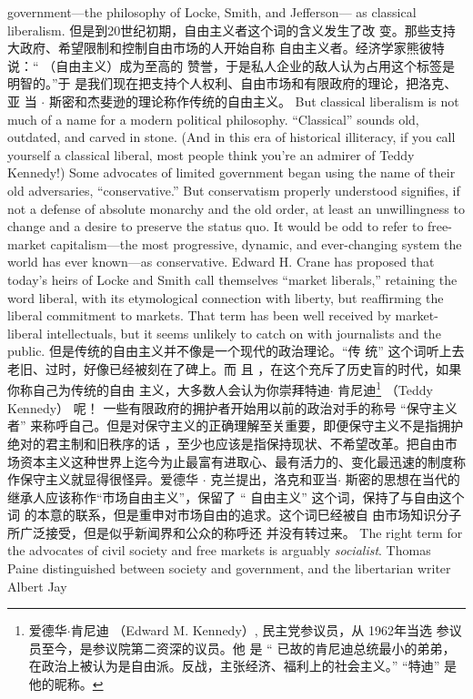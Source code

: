 \begin{paracol}{2}
government---the philosophy of Locke, Smith, and Jefferson---
as classical liberalism.
\switchcolumn
但是到20世纪初期，自由主义者这个词的含义发生了改
变。那些支持大政府、希望限制和控制自由市场的人开始自称
自由主义者。经济学家熊彼特说：“ （自由主义）成为至高的
赞誉，于是私人企业的敌人认为占用这个标签是明智的。”于
是我们现在把支持个人权利、自由市场和有限政府的理论，把洛克、亚 当 $\cdot$ 斯密和杰斐逊的理论称作传统的自由主义。
\switchcolumn*
But classical liberalism is not much of a name for a modern
political philosophy. ``Classical'' sounds old, outdated, and
carved in stone. (And in this era of historical illiteracy, if you call
yourself a classical liberal, most people think you're an admirer
of Teddy Kennedy!) Some advocates of limited government
began using the name of their old adversaries, ``conservative.''
But conservatism properly understood signifies, if not a defense
of absolute monarchy and the old order, at least an unwillingness to change and a desire to preserve the status quo. It would
be odd to refer to free-market capitalism---the most progressive, dynamic, and ever-changing system the world has ever
known---as conservative. Edward H. Crane has proposed that
today's heirs of Locke and Smith call themselves ``market liberals,'' retaining the word liberal, with its etymological connection with liberty, but reaffirming the liberal commitment to
markets. That term has been well received by market-liberal intellectuals, but it seems unlikely to catch on with journalists
and the public.
\switchcolumn
但是传统的自由主义并不像是一个现代的政治理论。“传
统” 这个词听上去老旧、过时，好像已经被刻在了碑上。而
且 ，在这个充斥了历史盲的时代，如果你称自己为传统的自由
主义，大多数人会认为你崇拜特迪$\cdot$ 肯尼迪\footnote{爱德华$\cdot$肯尼迪 （Edward  M. Kennedy）, 民主党参议员，从 1962年当选	参议员至今，是参议院第二资深的议员。他 是 “ 已故的肯尼迪总统最小的弟弟，在政治上被认为是自由派。反战，主张经济、福利上的社会主义。” “特迪” 是他的昵称。} （Teddy  Kennedy） 呢！ 一些有限政府的拥护者开始用以前的政治对手的称号 “保守主义者” 来称呼自己。但是对保守主义的正确理解至关重要，即便保守主义不是指拥护绝对的君主制和旧秩序的话 ，至少也应该是指保持现状、不希望改革。把自由市场资本主义这种世界上迄今为止最富有进取心、最有活力的、变化最迅速的制度称作保守主义就显得很怪异。爱德华 $\cdot$ 克兰提出，洛克和亚当$\cdot$ 斯密的思想在当代的继承人应该称作“市场自由主义”，保留了 “ 自由主义” 这个词，保持了与自由这个词
的本意的联系，但是重申对市场自由的追求。这个词巳经被自
由市场知识分子所广泛接受，但是似乎新闻界和公众的称呼还
并没有转过来。
\switchcolumn*
The right term for the advocates of civil society and free markets is arguably \textit{socialist}. Thomas Paine distinguished between society and government, and the libertarian writer Albert Jay

\end{paracol}
